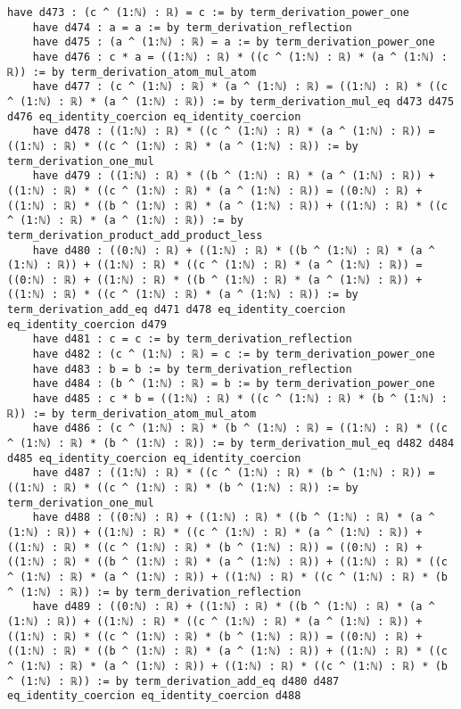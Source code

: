 \documentclass{article}
\begin{document}
\begin{tcolorbox}[colback=white!10, width=\linewidth]
\begin{lstlisting}[language=Lean4]
    have d473 : (c ^ (1:ℕ) : ℝ) = c := by term_derivation_power_one
    have d474 : a = a := by term_derivation_reflection
    have d475 : (a ^ (1:ℕ) : ℝ) = a := by term_derivation_power_one
    have d476 : c * a = ((1:ℕ) : ℝ) * ((c ^ (1:ℕ) : ℝ) * (a ^ (1:ℕ) : ℝ)) := by term_derivation_atom_mul_atom
    have d477 : (c ^ (1:ℕ) : ℝ) * (a ^ (1:ℕ) : ℝ) = ((1:ℕ) : ℝ) * ((c ^ (1:ℕ) : ℝ) * (a ^ (1:ℕ) : ℝ)) := by term_derivation_mul_eq d473 d475 d476 eq_identity_coercion eq_identity_coercion
    have d478 : ((1:ℕ) : ℝ) * ((c ^ (1:ℕ) : ℝ) * (a ^ (1:ℕ) : ℝ)) = ((1:ℕ) : ℝ) * ((c ^ (1:ℕ) : ℝ) * (a ^ (1:ℕ) : ℝ)) := by term_derivation_one_mul
    have d479 : ((1:ℕ) : ℝ) * ((b ^ (1:ℕ) : ℝ) * (a ^ (1:ℕ) : ℝ)) + ((1:ℕ) : ℝ) * ((c ^ (1:ℕ) : ℝ) * (a ^ (1:ℕ) : ℝ)) = ((0:ℕ) : ℝ) + ((1:ℕ) : ℝ) * ((b ^ (1:ℕ) : ℝ) * (a ^ (1:ℕ) : ℝ)) + ((1:ℕ) : ℝ) * ((c ^ (1:ℕ) : ℝ) * (a ^ (1:ℕ) : ℝ)) := by term_derivation_product_add_product_less
    have d480 : ((0:ℕ) : ℝ) + ((1:ℕ) : ℝ) * ((b ^ (1:ℕ) : ℝ) * (a ^ (1:ℕ) : ℝ)) + ((1:ℕ) : ℝ) * ((c ^ (1:ℕ) : ℝ) * (a ^ (1:ℕ) : ℝ)) = ((0:ℕ) : ℝ) + ((1:ℕ) : ℝ) * ((b ^ (1:ℕ) : ℝ) * (a ^ (1:ℕ) : ℝ)) + ((1:ℕ) : ℝ) * ((c ^ (1:ℕ) : ℝ) * (a ^ (1:ℕ) : ℝ)) := by term_derivation_add_eq d471 d478 eq_identity_coercion eq_identity_coercion d479
    have d481 : c = c := by term_derivation_reflection
    have d482 : (c ^ (1:ℕ) : ℝ) = c := by term_derivation_power_one
    have d483 : b = b := by term_derivation_reflection
    have d484 : (b ^ (1:ℕ) : ℝ) = b := by term_derivation_power_one
    have d485 : c * b = ((1:ℕ) : ℝ) * ((c ^ (1:ℕ) : ℝ) * (b ^ (1:ℕ) : ℝ)) := by term_derivation_atom_mul_atom
    have d486 : (c ^ (1:ℕ) : ℝ) * (b ^ (1:ℕ) : ℝ) = ((1:ℕ) : ℝ) * ((c ^ (1:ℕ) : ℝ) * (b ^ (1:ℕ) : ℝ)) := by term_derivation_mul_eq d482 d484 d485 eq_identity_coercion eq_identity_coercion
    have d487 : ((1:ℕ) : ℝ) * ((c ^ (1:ℕ) : ℝ) * (b ^ (1:ℕ) : ℝ)) = ((1:ℕ) : ℝ) * ((c ^ (1:ℕ) : ℝ) * (b ^ (1:ℕ) : ℝ)) := by term_derivation_one_mul
    have d488 : ((0:ℕ) : ℝ) + ((1:ℕ) : ℝ) * ((b ^ (1:ℕ) : ℝ) * (a ^ (1:ℕ) : ℝ)) + ((1:ℕ) : ℝ) * ((c ^ (1:ℕ) : ℝ) * (a ^ (1:ℕ) : ℝ)) + ((1:ℕ) : ℝ) * ((c ^ (1:ℕ) : ℝ) * (b ^ (1:ℕ) : ℝ)) = ((0:ℕ) : ℝ) + ((1:ℕ) : ℝ) * ((b ^ (1:ℕ) : ℝ) * (a ^ (1:ℕ) : ℝ)) + ((1:ℕ) : ℝ) * ((c ^ (1:ℕ) : ℝ) * (a ^ (1:ℕ) : ℝ)) + ((1:ℕ) : ℝ) * ((c ^ (1:ℕ) : ℝ) * (b ^ (1:ℕ) : ℝ)) := by term_derivation_reflection
    have d489 : ((0:ℕ) : ℝ) + ((1:ℕ) : ℝ) * ((b ^ (1:ℕ) : ℝ) * (a ^ (1:ℕ) : ℝ)) + ((1:ℕ) : ℝ) * ((c ^ (1:ℕ) : ℝ) * (a ^ (1:ℕ) : ℝ)) + ((1:ℕ) : ℝ) * ((c ^ (1:ℕ) : ℝ) * (b ^ (1:ℕ) : ℝ)) = ((0:ℕ) : ℝ) + ((1:ℕ) : ℝ) * ((b ^ (1:ℕ) : ℝ) * (a ^ (1:ℕ) : ℝ)) + ((1:ℕ) : ℝ) * ((c ^ (1:ℕ) : ℝ) * (a ^ (1:ℕ) : ℝ)) + ((1:ℕ) : ℝ) * ((c ^ (1:ℕ) : ℝ) * (b ^ (1:ℕ) : ℝ)) := by term_derivation_add_eq d480 d487 eq_identity_coercion eq_identity_coercion d488

\end{lstlisting}
\end{tcolorbox}
\end{document}
